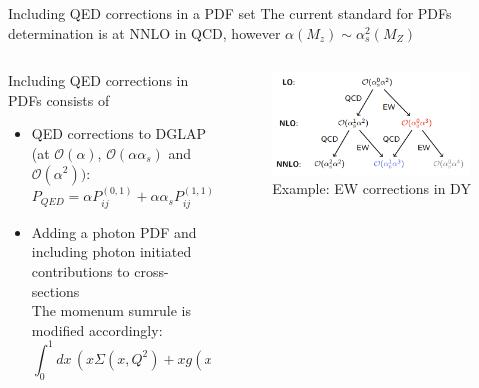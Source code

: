 \documentclass[aspectratio=169, 8pt,t]{beamer}
\begin{document}
\begin{frame}{Including QED corrections in a PDF set}
  The current standard for PDFs determination is at NNLO in QCD, however  $\alpha(M_z) \sim \alpha_s^2(M_Z)$

  \begin{columns}
    \begin{column}{0.49\textwidth}

      \vspace*{1em}
      Including QED corrections in PDFs consists of \vspace*{0.5em}
      \begin{itemize}
        \item QED corrections to DGLAP (at $\mathcal{O}(\alpha)$, $\mathcal{O}(\alpha \alpha_s)$ and $\mathcal{O}(\alpha^2))$: \\ 
        $P_{QED}=\alpha P_{ij}^{(0,1)}+\alpha \alpha_s P_{ij}^{(1,1)}+\alpha^2 P_{ij}^{(0,2)}+\ldots$
        \vspace*{0.5em}
        \item Adding a photon PDF and including photon initiated contributions to cross-sections \\
        The momenum sumrule is modified accordingly:   
        \begin{equation*}
          \int_0^1 dx\, \left(  x\Sigma(x,Q^2) + xg(x,Q^2) + x\gamma(x,Q^2) \right) =1
        \end{equation*}
      \end{itemize}
    \end{column}

    \begin{column}{0.49\textwidth}
      \begin{figure}
        \includegraphics[width=0.99\textwidth]{figures/ewcorrections_dy.png}
        \caption*{Example: EW corrections in DY}
      \end{figure}
    \end{column}
  \end{columns}
\end{frame}
\end{document}
